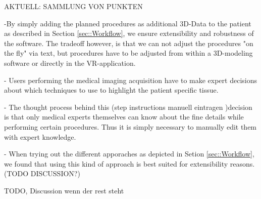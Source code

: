 AKTUELL: SAMMLUNG VON PUNKTEN

-By simply adding the planned procedures as additional 3D-Data to the patient as described in Section \ref{sec::Workflow}, we ensure extensibility and robustness of the software.
The tradeoff however, is that we can not adjust the procedures "on the fly" via text, but procedures have to be adjusted from within a 3D-modeling software or directly in the VR-application.

- Users performing the medical imaging acquisition have to make expert decisions about which techniques to use to highlight the patient specific tissue.

- The thought process behind this (step instructions manuell eintragen )decision is that only medical experts themselves can know about the fine details while performing certain procedures.
Thus it is simply necessary to manually edit them with expert knowledge.

- When trying out the different apporaches as depicted in Setion \ref{sec::Workflow}, we found that using this kind of approach is best suited for extensibility reasons. (TODO DISCUSSION?)

TODO, Discussion wenn der rest steht